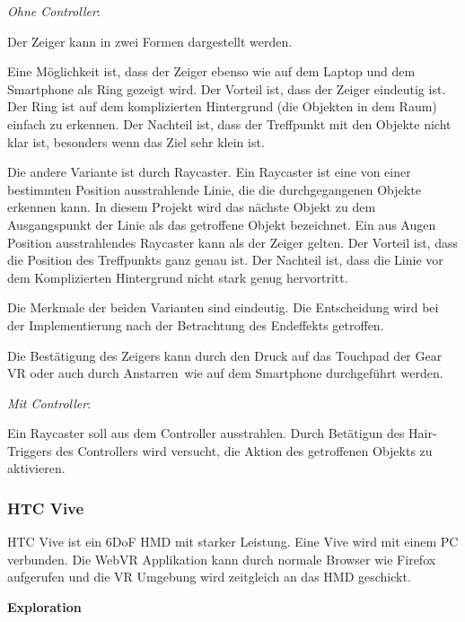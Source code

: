   \noindent
  \textsl{Ohne Controller}:
  \vspace{0.5em}
  
  \noindent
  Der Zeiger kann in zwei Formen dargestellt werden.
  
  Eine Möglichkeit ist, dass der Zeiger ebenso wie auf dem Laptop und dem Smartphone als Ring gezeigt wird. Der Vorteil ist, dass der Zeiger eindeutig ist. Der Ring ist auf dem komplizierten Hintergrund (die Objekten in dem Raum) einfach zu erkennen. Der Nachteil ist, dass der Treffpunkt mit den Objekte nicht klar ist, besonders wenn das Ziel sehr klein ist.
  
  Die andere Variante ist durch Raycaster. Ein Raycaster ist eine von einer bestimmten Position ausstrahlende Linie, die die durchgegangenen Objekte erkennen kann. In diesem Projekt wird das nächste Objekt zu dem Ausgangspunkt der Linie als das getroffene Objekt bezeichnet. Ein aus Augen Position ausstrahlendes Raycaster kann als der Zeiger gelten. Der Vorteil ist, dass die Position des Treffpunkts ganz genau ist. Der Nachteil ist, dass die Linie vor dem Komplizierten Hintergrund nicht stark genug hervortritt.
  
  Die Merkmale der beiden Varianten sind eindeutig. Die Entscheidung wird bei der Implementierung nach der Betrachtung des Endeffekts getroffen.
  
  Die Bestätigung des Zeigers kann durch den Druck auf das Touchpad der Gear VR oder auch durch \glqq Anstarren\grqq\ wie auf dem Smartphone durchgeführt werden.
  
  \vspace{0.5em}
  \noindent
  \textsl{Mit Controller}:
  \vspace{0.5em}
  
  \noindent
  Ein Raycaster soll aus dem Controller ausstrahlen. Durch Betätigun des Hair-Triggers des Controllers wird versucht, die Aktion des getroffenen Objekts zu aktivieren.
  
 \subsubsection{HTC Vive}
 HTC Vive ist ein 6DoF HMD mit starker Leistung. Eine Vive wird mit einem PC verbunden. Die WebVR Applikation kann durch normale Browser wie Firefox aufgerufen und die VR Umgebung wird zeitgleich an das HMD geschickt.
 
  \vspace{1em}
  \noindent
  \textbf{Exploration}
  \vspace{1em}
  
